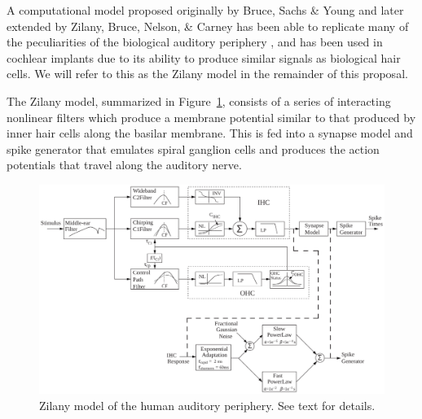 \documentclass{article}
\begin{document}
A computational model proposed originally by
Bruce, Sachs \& Young
and later extended by Zilany, Bruce, Nelson, \& Carney
has been able to replicate
many of the peculiarities
of the biological auditory periphery
\citep{bruce2003,zilany2006,zilany2007,zilany2009,zilany2014},
and has been used in cochlear implants
due to its ability to produce
similar signals as biological hair cells.
We will refer to this as the
Zilany model in the remainder of this proposal.

The Zilany model,
summarized in Figure~\ref{fig:zilany},
consists of a series
of interacting nonlinear filters
which produce a membrane potential
similar to that produced
by inner hair cells along the basilar membrane.
This is fed into a synapse model and spike generator
that emulates spiral ganglion cells
and produces the action potentials
that travel along the auditory nerve.

\begin{figure}
  \begin{center}
    \includegraphics[width=1\linewidth]{zilany}
  \end{center}
  \caption{Zilany model of the human auditory periphery.
    See text for details.}
  \label{fig:zilany}
\end{figure}
\end{document}
